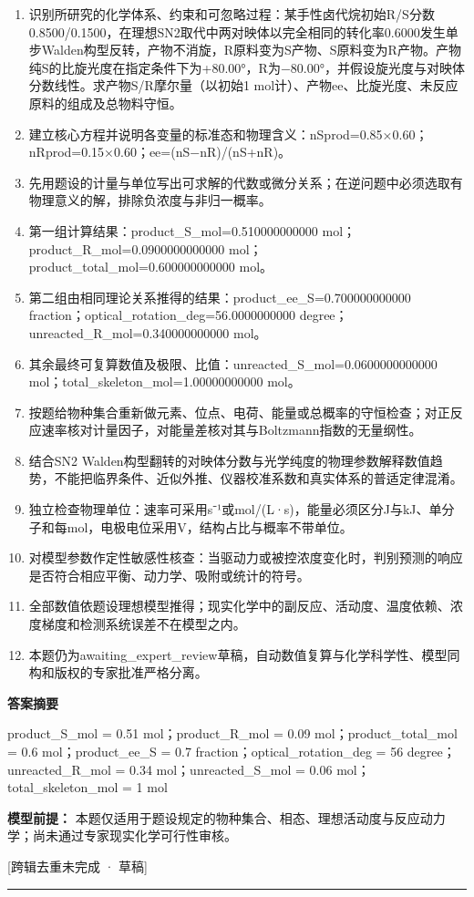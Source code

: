 \documentclass[UTF8,11pt,a4paper]{ctexart}
\begin{document}
\begin{enumerate}
\item 识别所研究的化学体系、约束和可忽略过程：某手性卤代烷初始R/S分数0.8500/0.1500，在理想SN2取代中两对映体以完全相同的转化率0.6000发生单步Walden构型反转，产物不消旋，R原料变为S产物、S原料变为R产物。产物纯S的比旋光度在指定条件下为+80.00°，R为−80.00°，并假设旋光度与对映体分数线性。求产物S/R摩尔量（以初始1 mol计）、产物ee、比旋光度、未反应原料的组成及总物料守恒。
\item 建立核心方程并说明各变量的标准态和物理含义：nSprod=0.85×0.60；nRprod=0.15×0.60；ee=(nS−nR)/(nS+nR)。
\item 先用题设的计量与单位写出可求解的代数或微分关系；在逆问题中必须选取有物理意义的解，排除负浓度与非归一概率。
\item 第一组计算结果：product\_S\_mol=0.510000000000 mol；product\_R\_mol=0.0900000000000 mol；product\_total\_mol=0.600000000000 mol。
\item 第二组由相同理论关系推得的结果：product\_ee\_S=0.700000000000 fraction；optical\_rotation\_deg=56.0000000000 degree；unreacted\_R\_mol=0.340000000000 mol。
\item 其余最终可复算数值及极限、比值：unreacted\_S\_mol=0.0600000000000 mol；total\_skeleton\_mol=1.00000000000 mol。
\item 按题给物种集合重新做元素、位点、电荷、能量或总概率的守恒检查；对正反应速率核对计量因子，对能量差核对其与Boltzmann指数的无量纲性。
\item 结合SN2 Walden构型翻转的对映体分数与光学纯度的物理参数解释数值趋势，不能把临界条件、近似外推、仪器校准系数和真实体系的普适定律混淆。
\item 独立检查物理单位：速率可采用s⁻¹或mol/(L·s)，能量必须区分J与kJ、单分子和每mol，电极电位采用V，结构占比与概率不带单位。
\item 对模型参数作定性敏感性核查：当驱动力或被控浓度变化时，判别预测的响应是否符合相应平衡、动力学、吸附或统计的符号。
\item 全部数值依题设理想模型推得；现实化学中的副反应、活动度、温度依赖、浓度梯度和检测系统误差不在模型之内。
\item 本题仍为awaiting\_expert\_review草稿，自动数值复算与化学科学性、模型同构和版权的专家批准严格分离。
\end{enumerate}
\noindent\textbf{答案摘要}\par
product\_S\_mol = 0.51 mol；product\_R\_mol = 0.09 mol；product\_total\_mol = 0.6 mol；product\_ee\_S = 0.7 fraction；optical\_rotation\_deg = 56 degree；unreacted\_R\_mol = 0.34 mol；unreacted\_S\_mol = 0.06 mol；total\_skeleton\_mol = 1 mol\par
\noindent\textbf{模型前提：}
本题仅适用于题设规定的物种集合、相态、理想活动度与反应动力学；尚未通过专家现实化学可行性审核。\par
\noindent\textcolor{red!65!black}{[跨辑去重未完成 · 草稿]} \par
\medskip\hrule\medskip
{}
\end{document}
